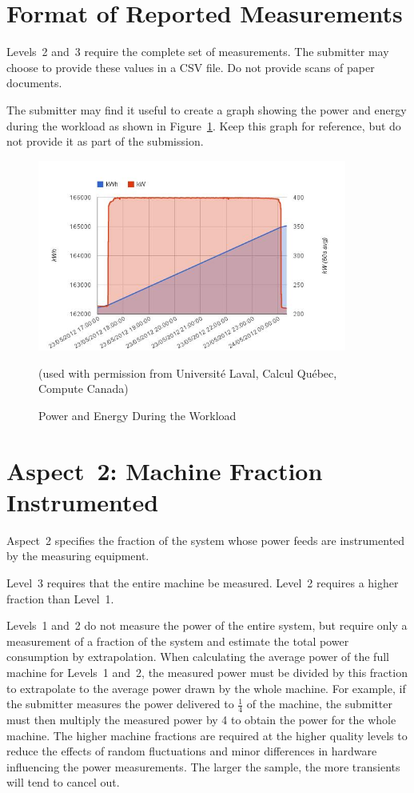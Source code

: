 \section{Format of Reported Measurements}
\label{sec:FoRM}

Levels~2 and~3 require the complete set of measurements.
The submitter may choose to provide these values in a CSV file.
Do not provide scans of paper documents.

The submitter may find it useful to create a graph showing the power and energy during the workload as shown in Figure~\ref{fig:powengwl}.
Keep this graph for reference, but do not provide it as part of the submission.


\begin{figure}
\centering
\includegraphics[width=4in]{fig3-6}
\caption{Power and Energy During the Workload}
(used with permission from Universit\'{e} Laval, Calcul Qu\'{e}bec, Compute Canada)
\label{fig:powengwl}
\end{figure}

\section{Aspect~2: Machine Fraction Instrumented}
\label{sec:A2MFI}

Aspect~2 specifies the fraction of the system whose power feeds are instrumented by the measuring equipment.

Level~3 requires that the entire machine be measured.
Level~2 requires a higher fraction than Level~1.

Levels~1 and~2 do not measure the power of the entire system, but require only a measurement of a fraction of the system and estimate the total power consumption by extrapolation.
When calculating the average power of the full machine for Levels~1 and~2, the measured power must be divided by this fraction to extrapolate to the average power drawn by the whole machine.
For example, if the submitter measures the power delivered to $ \frac{1}{4} $ of the machine, the submitter must then multiply the measured power by 4 to obtain the power for the whole machine.
The higher machine fractions are required at the higher quality levels to reduce the effects of random fluctuations and minor differences in hardware influencing the power measurements.
The larger the sample, the more transients will tend to cancel out.

